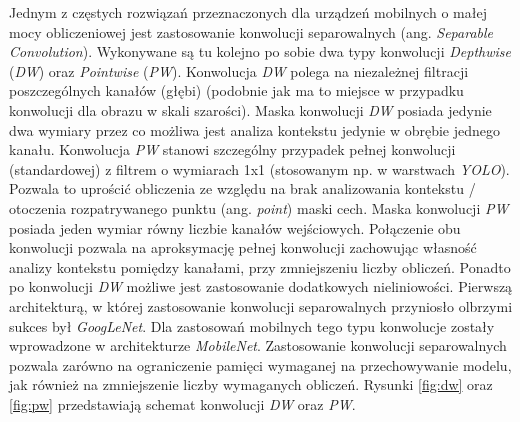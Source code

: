 Jednym z częstych rozwiązań przeznaczonych dla urządzeń mobilnych o małej mocy obliczeniowej jest zastosowanie konwolucji separowalnych (ang. \emph{Separable Convolution}). 
Wykonywane są tu kolejno po sobie dwa typy konwolucji \emph{Depthwise} (\emph{DW}) oraz \emph{Pointwise} (\emph{PW}). 
Konwolucja \emph{DW} polega na niezależnej filtracji poszczególnych kanałów (głębi) (podobnie jak ma to miejsce w przypadku konwolucji dla obrazu w skali szarości).
Maska konwolucji \emph{DW} posiada jedynie dwa wymiary przez co możliwa jest analiza kontekstu jedynie w obrębie jednego kanału.
Konwolucja \emph{PW} stanowi szczególny przypadek pełnej konwolucji (standardowej) z filtrem o wymiarach 1x1 (stosowanym np. w warstwach \emph{YOLO}).
Pozwala to uprościć obliczenia ze względu na brak analizowania kontekstu / otoczenia rozpatrywanego punktu (ang. \emph{point}) maski cech.
Maska konwolucji \emph{PW} posiada jeden wymiar równy liczbie kanałów wejściowych.
Połączenie obu konwolucji pozwala na aproksymację pełnej konwolucji zachowując własność analizy kontekstu pomiędzy kanałami, przy zmniejszeniu liczby obliczeń. 
Ponadto po konwolucji \emph{DW} możliwe jest zastosowanie dodatkowych nieliniowości.
Pierwszą architekturą, w której zastosowanie konwolucji separowalnych przyniosło olbrzymi sukces był \emph{GoogLeNet}\cite{inception_googlenet}. 
Dla zastosowań mobilnych tego typu konwolucje zostały wprowadzone w architekturze \emph{MobileNet}\cite{mobilenet}. 
Zastosowanie konwolucji separowalnych pozwala zarówno na ograniczenie pamięci wymaganej na przechowywanie modelu, jak również na zmniejszenie liczby wymaganych obliczeń.
Rysunki \ref{fig:dw} oraz \ref{fig:pw} przedstawiają schemat konwolucji \emph{DW} oraz \emph{PW}. 

